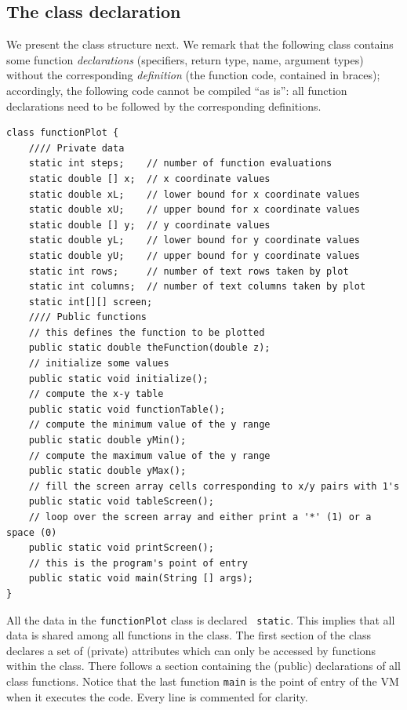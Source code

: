 \documentclass[a4paper]{book}
\theoremstyle{changebreak}                %
\begin{document}
\subsection{The class declaration}
We present the class structure next. We remark
that the following class contains some function {\it
  declarations} (specifiers, return type, name,
argument types) without the corresponding {\it
  definition} (the function code, contained in
braces); accordingly, the following code cannot be
compiled ``as is'': all function declarations need to be followed by
the corresponding definitions.  {\small
\begin{verbatim}
class functionPlot {
    //// Private data
    static int steps;    // number of function evaluations
    static double [] x;  // x coordinate values
    static double xL;    // lower bound for x coordinate values
    static double xU;    // upper bound for x coordinate values
    static double [] y;  // y coordinate values
    static double yL;    // lower bound for y coordinate values
    static double yU;    // upper bound for y coordinate values
    static int rows;     // number of text rows taken by plot
    static int columns;  // number of text columns taken by plot
    static int[][] screen;
    //// Public functions
    // this defines the function to be plotted
    public static double theFunction(double z);
    // initialize some values
    public static void initialize();
    // compute the x-y table
    public static void functionTable();
    // compute the minimum value of the y range
    public static double yMin();
    // compute the maximum value of the y range
    public static double yMax();
    // fill the screen array cells corresponding to x/y pairs with 1's
    public static void tableScreen();
    // loop over the screen array and either print a '*' (1) or a space (0)
    public static void printScreen();
    // this is the program's point of entry
    public static void main(String [] args);
}
\end{verbatim}
}

All the data in the {\tt functionPlot} class is declared {\tt
  static}. This implies that all data is shared
among all functions in the class. The first section of the class
declares a set of (private) attributes
which can only be accessed by functions within the class. There
follows a section containing the (public) declarations
of all class functions. Notice that the last
function {\tt main} is the point of entry of the
VM when it executes the code. Every line is
commented for clarity.
\end{document}
